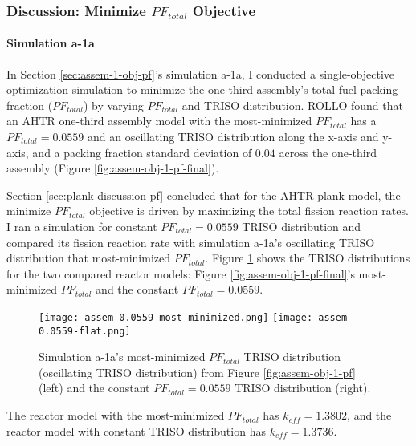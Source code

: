 \subsubsection{Discussion: Minimize $PF_{total}$ Objective}
\paragraph{Simulation a-1a}
In Section \ref{sec:assem-1-obj-pf}'s simulation a-1a, I conducted a single-objective 
optimization simulation to minimize the one-third assembly's total fuel packing fraction 
($PF_{total}$) by varying $PF_{total}$ and TRISO distribution. 
\gls{ROLLO} found that an \gls{AHTR} one-third assembly model with 
the most-minimized $PF_{total}$ has a $PF_{total}= 0.0559$ and an oscillating TRISO 
distribution along the x-axis and y-axis, and a packing fraction standard 
deviation of $0.04$ across the one-third assembly (Figure \ref{fig:assem-obj-1-pf-final}).

Section \ref{sec:plank-discussion-pf} concluded that for the \gls{AHTR} plank model, 
the minimize $PF_{total}$ objective is driven by maximizing the total fission reaction 
rates. 
I ran a simulation for constant $PF_{total} = 0.0559$ TRISO distribution and compared its 
fission reaction rate with simulation a-1a's oscillating TRISO distribution that 
most-minimized $PF_{total}$. 
Figure \ref{fig:assem-0.0559-comparison} shows the TRISO distributions for the two 
compared reactor models: Figure \ref{fig:assem-obj-1-pf-final}'s most-minimized 
$PF_{total}$ and the constant $PF_{total} = 0.0559$. 
\begin{figure}[htbp!]
    \centering
    \texttt{[image: assem-0.0559-most-minimized.png]} 
    \texttt{[image: assem-0.0559-flat.png]} 
    \caption{Simulation a-1a's most-minimized $PF_{total}$ TRISO distribution 
    (oscillating TRISO distribution) from Figure \ref{fig:assem-obj-1-pf} (left) and the 
    constant $PF_{total} = 0.0559$ TRISO distribution (right).}
    \label{fig:assem-0.0559-comparison}
\end{figure}
The reactor model with the most-minimized $PF_{total}$ has $k_{eff}=1.3802$, and 
the reactor model with constant TRISO distribution has $k_{eff}=1.3736$.

